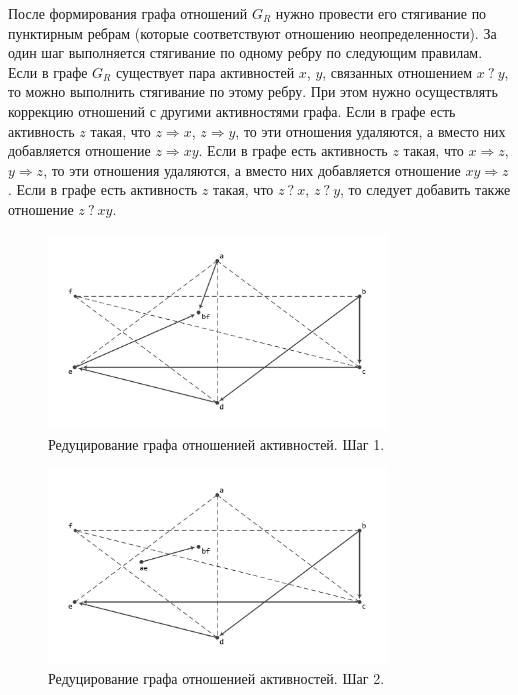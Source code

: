 \documentclass[
11pt,%
tightenlines,%
twoside,%
onecolumn,%
nofloats,%
nobibnotes,%
nofootinbib,%
superscriptaddress,%
noshowpacs,%
centertags]%
{revtex4}
\begin{document}
После формирования графа отношений $G_R$ нужно провести его стягивание по пунктирным ребрам (которые соответствуют отношению неопределенности).
За один шаг выполняется стягивание по одному ребру по следующим правилам.
Если в графе $G_R$ существует пара активностей $x$, $y$, связанных отношением $x \ ? \ y$, то можно выполнить стягивание по этому ребру.
При этом нужно осуществлять коррекцию отношений с другими активностями графа.
Если в графе есть активность $z$ такая, что $z \Rightarrow x$, $z \Rightarrow y$, то эти отношения удаляются, а вместо них добавляется отношение $z \Rightarrow xy$.
Если в графе есть активность $z$ такая, что $x \Rightarrow z$, $y \Rightarrow z$, то эти отношения удаляются, а вместо них добавляется отношение $xy \Rightarrow z$.
Если в графе есть активность $z$ такая, что $z \ ? \ x$, $z \ ? \ y$, то следует добавить также отношение $z \ ? \ xy$.

\begin{figure}[h]
\setcaptionmargin{5mm}
\includegraphics[width=0.8\textwidth]{pics/g_r_reduce1.pdf}
\caption{Редуцирование графа отношенией активностей. Шаг 1.}
\label{fig:g_r_reduce1}
\end{figure}

\begin{figure}[h]
\setcaptionmargin{5mm}
\includegraphics[width=0.8\textwidth]{pics/g_r_reduce2.pdf}
\caption{Редуцирование графа отношенией активностей. Шаг 2.}
\label{fig:g_r_reduce2}
\end{figure}
\end{document}
